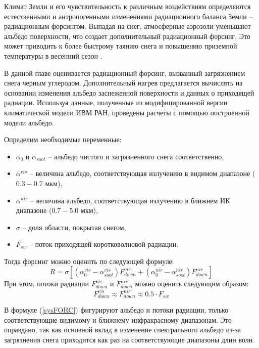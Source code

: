 \documentclass[a4paper, fontsize=14pt]{scrartcl}
\begin{document}
Климат Земли и его чувствительность к различным воздействиям определяются естественными и антропогенными изменениями радиационного баланса Земли -- радиационным форсингом. Выпадая на снег, атмосферные аэрозоли уменьшают альбедо поверхности, что создает дополнительный радиационный форсинг. Это может приводить к более быстрому таянию снега и повышению приземной температуры в весенний сезон \cite{Chernenkov2021rus}. 

В данной главе оценивается радиационный форсинг, вызванный загрязнением снега черным углеродом. Дополнительный нагрев предлагается вычислять на основании изменения альбедо заснеженной поверхности и данных о приходящей радиации. Используя данные, полученные из модифицированной версии климатической модели ИВМ РАН, проведены расчеты с помощью построенной модели альбедо.

Определим необходимые переменные:
\begin{itemize}
    \item $\alpha_{0}$ и $\alpha_{soot}$ -- альбедо чистого и загрязненного снега соответственно,
    \item $\alpha^{vis}$ -- величина альбедо, соответствующая излучению в видимом диапазоне ($0.3-0.7$ мкм),
    \item $\alpha^{nir}$ -- величина альбедо, соответствующая излучению в ближнем ИК диапазоне ($0.7-5.0$ мкм),
    \item $\sigma$ -- доля области, покрытая снегом,
    \item $F_{sw}$ -- поток приходящей коротковолновой радиации.
\end{itemize}
Тогда форсинг можно оценить по следующей формуле:
\begin{equation}
    R = \sigma [ (\alpha_{0}^{vis} - \alpha_{soot}^{vis})F_{down}^{vis} + (\alpha_{0}^{nir} - \alpha_{soot}^{nir})F_{down}^{nir} ] \label{sysFORC}  
\end{equation}
При этом, потоки радиации $F_{down}^{vis}$ и $F_{down}^{nir}$ можно оценить следующим образом: 
\begin{equation}
    F_{down}^{vis} \approx F_{down}^{nir} \approx 0.5 \cdot F_{sw} \label{sys}  
\end{equation}

В формуле (\ref{sysFORC}) фигурируют альбедо и потоки радиации, только соответствующие видимому и ближнему инфракрасному диапазонам. Это оправдано, так как основной вклад в изменение спектрального альбедо из-за загрязнения снега приходится как раз на соответствующие диапазоны длин волн.
\end{document}
